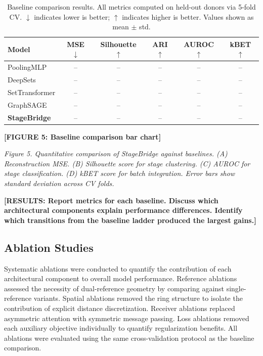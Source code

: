 \begin{table}[h]
\centering
\caption{Baseline comparison results. All metrics computed on held-out donors via 5-fold CV. $\downarrow$ indicates lower is better; $\uparrow$ indicates higher is better. Values shown as mean $\pm$ std.}
\label{tab:baselines}
\begin{tabular}{lccccc}
\toprule
\textbf{Model} & \textbf{MSE} $\downarrow$ & \textbf{Silhouette} $\uparrow$ & \textbf{ARI} $\uparrow$ & \textbf{AUROC} $\uparrow$ & \textbf{kBET} $\uparrow$ \\
\midrule
PoolingMLP & -- & -- & -- & -- & -- \\
DeepSets & -- & -- & -- & -- & -- \\
SetTransformer & -- & -- & -- & -- & -- \\
GraphSAGE & -- & -- & -- & -- & -- \\
\textbf{StageBridge} & -- & -- & -- & -- & -- \\
\bottomrule
\end{tabular}
\end{table}

\textbf{[FIGURE 5: Baseline comparison bar chart]}

\textit{Figure 5. Quantitative comparison of StageBridge against baselines. (A) Reconstruction MSE. (B) Silhouette score for stage clustering. (C) AUROC for stage classification. (D) kBET score for batch integration. Error bars show standard deviation across CV folds.}

\textbf{[RESULTS: Report metrics for each baseline. Discuss which architectural components explain performance differences. Identify which transitions from the baseline ladder produced the largest gains.]}


\subsection{Ablation Studies}

Systematic ablations were conducted to quantify the contribution of each architectural component to overall model performance. Reference ablations assessed the necessity of dual-reference geometry by comparing against single-reference variants. Spatial ablations removed the ring structure to isolate the contribution of explicit distance discretization. Receiver ablations replaced asymmetric attention with symmetric message passing. Loss ablations removed each auxiliary objective individually to quantify regularization benefits. All ablations were evaluated using the same cross-validation protocol as the baseline comparison.

